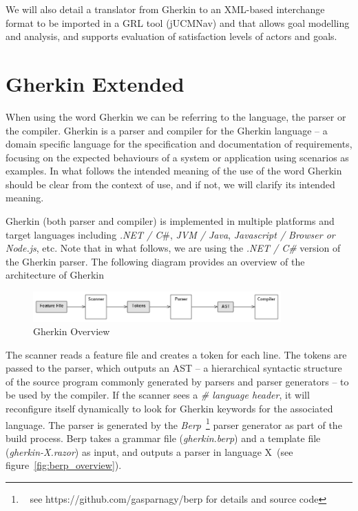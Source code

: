 \documentclass[dissertation,final]{softeng}
\begin{document}
We will also detail a translator from Gherkin to an XML-based interchange format to be imported in a GRL tool (jUCMNav) and that allows goal modelling and analysis, and supports evaluation of satisfaction levels of actors and goals.

\section{Gherkin Extended}
\label{sec:gherkin_extended}
When using the word Gherkin we can be referring to the language, the parser or the compiler. Gherkin is a parser and compiler for the Gherkin language -- a domain specific language for the specification and documentation of requirements, focusing on the expected behaviours of a system or application using scenarios as examples. In what follows the intended meaning of the use of the word Gherkin should be clear from the context of use, and if not, we will clarify its intended meaning.

Gherkin (both parser and compiler) is implemented in multiple platforms and target languages including \emph{.NET / C$\#$}, \emph{JVM / Java}, \emph{Javascript / Browser or Node.js}, etc. Note that in what follows, we are using the \emph{.NET / C\#} version of the Gherkin parser. The following diagram provides an overview of the architecture of Gherkin

\begin{figure}[h!]
\includegraphics[width=0.85\textwidth]{gherkin_overview}
\centering
\caption[Gherkin Overview]{Gherkin Overview~\footnotemark}
\label{fig:gherkin_overview}
\end{figure}

The scanner reads a feature file and creates a token for each line. The tokens are passed to the parser, which outputs an AST -- a hierarchical syntactic structure of the source program commonly generated by parsers and parser generators -- to be used by the compiler. If the scanner sees a \emph{\# language header}, it will reconfigure itself dynamically to look for Gherkin keywords for the associated language. The parser is generated by the \emph{Berp}~\footnote{~ see https://github.com/gasparnagy/berp for details and source code} parser generator as part of the build process. Berp takes a grammar file (\emph{gherkin.berp}) and a template file (\emph{gherkin-X.razor}) as input, and outputs a parser in language X~(see figure~\ref{fig:berp_overview}).
\end{document}

